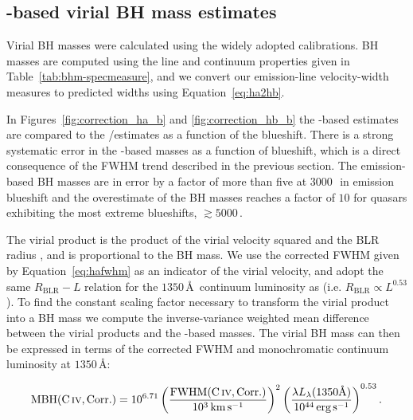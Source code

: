 \subsection{-based virial BH mass estimates}

Virial BH masses were calculated using the widely adopted \citet{vestergaard06} calibrations.
BH masses are computed using the line and continuum properties given in Table~\ref{tab:bhm-specmeasure}, and we convert our \ha emission-line velocity-width measures to predicted \hb widths using Equation~\ref{eq:ha2hb}.

In Figures~\ref{fig:correction_ha_b} and \ref{fig:correction_hb_b} the -based estimates are compared to the \hans/\hb estimates as a function of the  blueshift.
There is a strong systematic error in the -based masses as a function of blueshift, which is a direct consequence of the FWHM trend described in the previous section.
The  emission-based BH masses are in error by a factor of more than five at $3000$\,\kms\, in  emission blueshift and the overestimate of the BH masses reaches a factor of $10$ for quasars exhibiting the most extreme blueshifts, $\gtrsim5000$\,\kms.

The virial product is the product of the virial velocity squared and the BLR radius \citep[e.g.][]{shen13}, and is proportional to the BH mass.
We use the corrected  FWHM given by Equation~\ref{eq:hafwhm} as an indicator of the virial velocity, and adopt the same $R_{\text{BLR}}-L$ relation for the $1350$\,\AA\, continuum luminosity as \citet{vestergaard06} (i.e. $R_{\text{BLR}} \propto L^{0.53}$).
To find the constant scaling factor necessary to transform the virial product into a BH mass we compute the inverse-variance weighted mean difference between the virial products and the \hans-based masses.
The virial BH mass can then be expressed in terms of the corrected  FWHM and monochromatic continuum luminosity at $1350$\,\AA:

\begingroup\makeatletter{}\check@mathfonts
\begin{eqnarray}
  \label{eq:masscorrection}
  \text{MBH}(\text{C}\,\textsc{iv}, \text{Corr.}) = 10^{6.71}\left( \frac{ \text{FWHM}(\text{C}\,\textsc{iv}, \text{Corr.})}{10^3 \,\text{km}\,\text{s}^{-1}} \right)^2 \left( \frac{\lambda L_{\lambda} (1350 \text{\AA}) }{10^{44} \,\text{erg}\,\text{s}^{-1}}  \right)^{0.53}.
\end{eqnarray}
\endgroup

